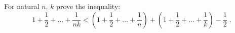 \problem
For natural $n$, $k$ prove the inequality:
\[
    1 + \frac{1}{2} + \ldots + \frac{1}{n k}
<
    \left(
        1 + \frac{1}{2} + \ldots + \frac{1}{n}
    \right)
    +
    \left(
        1 + \frac{1}{2} + \dots + \frac{1}{k}
    \right)
    -
    \frac{1}{2}
\;.\]
\solution
\endproblem
